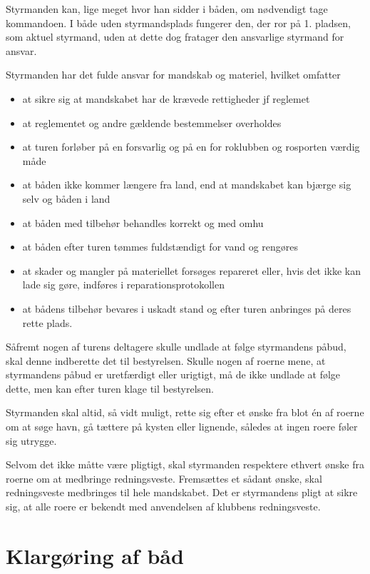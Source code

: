 \documentclass{article}
\begin{document}
Styrmanden kan, lige meget hvor han sidder i båden, om nødvendigt tage
kommandoen. I både uden styrmandsplads fungerer den, der ror på 1.
pladsen, som aktuel styrmand, uden at dette dog fratager den ansvarlige
styrmand for ansvar.

Styrmanden har det fulde ansvar for mandskab og materiel, hvilket
omfatter
\begin{itemize}
    \item at sikre sig at mandskabet har de krævede rettigheder jf
        reglemet
    \item at reglementet og andre gældende bestemmelser overholdes
    \item at turen forløber på en forsvarlig og på en for roklubben og
        rosporten værdig måde
    \item at båden ikke kommer længere fra land, end at mandskabet kan
        bjærge sig selv og båden i land
    \item at båden med tilbehør behandles korrekt og med omhu
    \item at båden efter turen tømmes fuldstændigt for vand og rengøres
    \item at skader og mangler på materiellet forsøges repareret eller,
        hvis det ikke kan lade sig gøre, indføres i
        reparationsprotokollen
    \item at bådens tilbehør bevares i uskadt stand og efter turen
        anbringes på deres rette plads.
\end{itemize}

Såfremt nogen af turens deltagere skulle undlade at følge styrmandens
påbud, skal denne indberette det til bestyrelsen. Skulle nogen af roerne
mene, at styrmandens påbud er uretfærdigt eller urigtigt, må de ikke
undlade at følge dette, men kan efter turen klage til bestyrelsen.

Styrmanden skal altid, så vidt muligt, rette sig efter et ønske fra blot
én af roerne om at søge havn, gå tættere på kysten eller lignende,
således at ingen roere føler sig utrygge.

Selvom det ikke måtte være pligtigt, skal styrmanden respektere ethvert
ønske fra roerne om at medbringe redningsveste. Fremsættes et sådant
ønske, skal redningsveste medbringes til hele mandskabet. Det er
styrmandens pligt at sikre sig, at alle roere er bekendt med anvendelsen
af klubbens redningsveste.

\section{Klargøring af båd}
\end{document}
